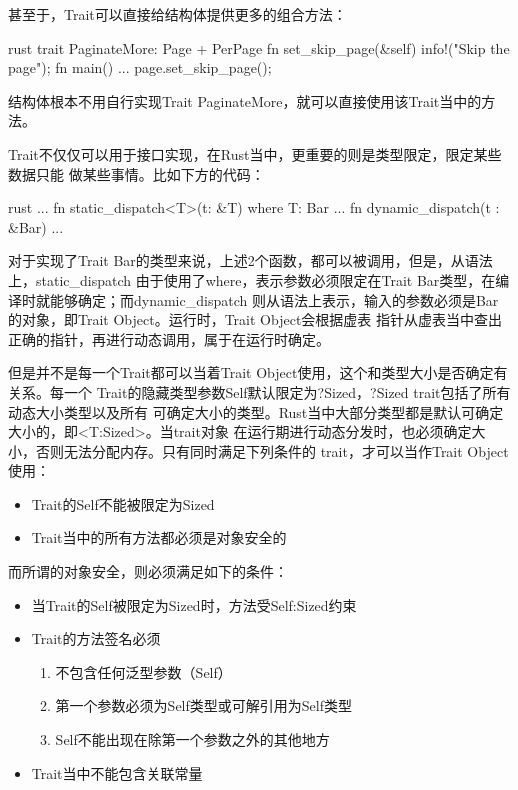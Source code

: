 甚至于，Trait可以直接给结构体提供更多的组合方法：
\begin{code-block}{rust}
trait PaginateMore: Page + PerPage {
    fn set_skip_page(&self) {
        info!("Skip the page");
    }
}
fn main() {
    ...
    page.set_skip_page();
}
\end{code-block}
结构体根本不用自行实现Trait PaginateMore，就可以直接使用该Trait当中的方法。

Trait不仅仅可以用于接口实现，在Rust当中，更重要的则是类型限定，限定某些数据只能
做某些事情。比如下方的代码：
\begin{code-block}{rust}
...
fn static_dispatch<T>(t: &T) where T: Bar {
    ...
}
fn dynamic_dispatch(t : &Bar) {
    ...
}
\end{code-block}
对于实现了Trait Bar的类型来说，上述2个函数，都可以被调用，但是，从语法上，static\_dispatch
由于使用了where，表示参数必须限定在Trait Bar类型，在编译时就能够确定；而dynamic\_dispatch
则从语法上表示，输入的参数必须是Bar的对象，即Trait Object。运行时，Trait Object会根据虚表
指针从虚表当中查出正确的指针，再进行动态调用，属于在运行时确定。

但是并不是每一个Trait都可以当着Trait Object使用，这个和类型大小是否确定有关系。每一个
Trait的隐藏类型参数Self默认限定为?Sized，?Sized trait包括了所有动态大小类型以及所有
可确定大小的类型。Rust当中大部分类型都是默认可确定大小的，即<T:Sized>。当trait对象
在运行期进行动态分发时，也必须确定大小，否则无法分配内存。只有同时满足下列条件的
trait，才可以当作Trait Object使用：
\begin{itemize}
  \item Trait的Self不能被限定为Sized
  \item Trait当中的所有方法都必须是对象安全的
\end{itemize}

而所谓的对象安全，则必须满足如下的条件：
\begin{itemize}
  \item 当Trait的Self被限定为Sized时，方法受Self:Sized约束
  \item Trait的方法签名必须
  \begin{enumerate}
    \item 不包含任何泛型参数（Self）
    \item 第一个参数必须为Self类型或可解引用为Self类型
    \item Self不能出现在除第一个参数之外的其他地方
  \end{enumerate}
  \item Trait当中不能包含关联常量
\end{itemize}

